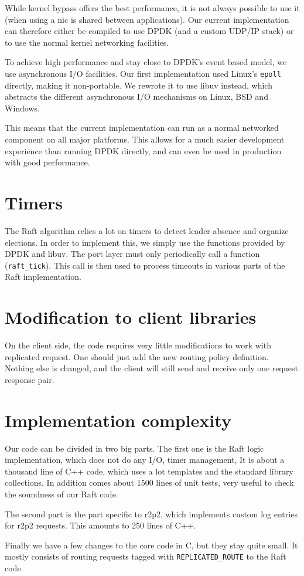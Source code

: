 While kernel bypass offers the best performance, it is not always possible to use it (\ie when using a \gls{nic} is shared between applications).
Our current implementation can therefore either be compiled to use DPDK (and a custom UDP/IP stack) or to use the normal kernel networking facilities.

To achieve high performance and stay close to DPDK's event based model, we use asynchronous I/O facilities.
Our first implementation used Linux's \texttt{epoll} directly, making it non-portable.
We rewrote it to use libuv\cite{libuv} instead, which abstracts the different asynchronous I/O mechanisms on Linux, BSD and Windows.

This means that the current implementation can run as a normal networked component on all major platforms.
This allows for a much easier development experience than running DPDK directly, and can even be used in production with good performance.

\section{Timers}

The Raft algorithm relies a lot on timers to detect leader absence and organize elections.
In order to implement this, we simply use the functions provided by DPDK and libuv.
The port layer must only periodically call a function (\texttt{raft\_tick}).
This call is then used to process timeouts in various parts of the Raft implementation.

\section{Modification to client libraries}

On the client side, the code requires very little modifications to work with replicated request.
One should just add the new routing policy definition.
Nothing else is changed, and the client will still send and receive only one request response pair.


\section{Implementation complexity}

Our code can be divided in two big parts.
The first one is the Raft logic implementation, which does not do any I/O, timer management, \etc
It is about a thousand line of C++ code, which uses a lot templates and the standard library collections.
In addition comes about 1500 lines of unit tests, very useful to check the soundness of our Raft code.

The second part is the part specific to \gls{r2p2}, which implements custom log entries for \gls{r2p2} requests.
This amounts to 250 lines of C++.

Finally we have a few changes to the core code in C, but they stay quite small.
It mostly consists of routing requests tagged with \texttt{REPLICATED\_ROUTE} to the Raft code.
